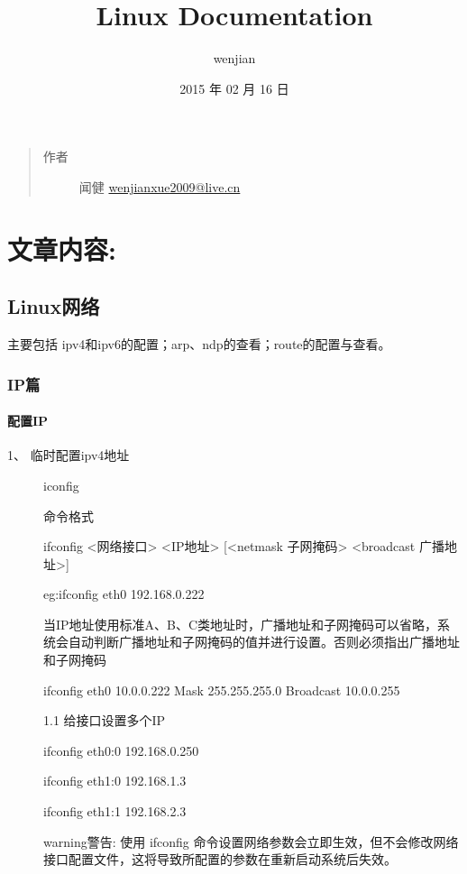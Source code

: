 \documentclass[letterpaper,10pt]{sphinxmanual}
\title{Linux Documentation}
\date{2015 年 02 月 16 日}
\author{wenjian}
\begin{document}
\maketitle
\tableofcontents
{}\label{index::doc}

\begin{quote}\begin{description}
\item[{作者}] \leavevmode
闻健 \href{mailto:wenjianxue2009@live.cn}{wenjianxue2009@live.cn}

\end{description}\end{quote}


\chapter{文章内容:}
\label{index:index}\label{index:id1}\label{index:linux}

\section{Linux网络}
\label{Linux_net/index::doc}\label{Linux_net/index:linux}
主要包括 ipv4和ipv6的配置；arp、ndp的查看；route的配置与查看。


\subsection{IP篇}
\label{Linux_net/ip:ip}\label{Linux_net/ip::doc}

\subsubsection{配置IP}
\label{Linux_net/ip:id1}\begin{description}
\item[{1、 临时配置ipv4地址}] \leavevmode
iconfig

命令格式

ifconfig \textless{}网络接口\textgreater{} \textless{}IP地址\textgreater{} {[}\textless{}netmask 子网掩码\textgreater{} \textless{}broadcast 广播地址\textgreater{}{]}

eg:ifconfig eth0 192.168.0.222

当IP地址使用标准A、B、C类地址时，广播地址和子网掩码可以省略，系统会自动判断广播地址和子网掩码的值并进行设置。否则必须指出广播地址和子网掩码

ifconfig eth0 10.0.0.222 Mask 255.255.255.0 Broadcast 10.0.0.255

1.1 给接口设置多个IP

ifconfig eth0:0 192.168.0.250

ifconfig eth1:0 192.168.1.3

ifconfig eth1:1 192.168.2.3

\begin{notice}{warning}{警告:}
使用 ifconfig 命令设置网络参数会立即生效，但不会修改网络接口配置文件，这将导致所配置的参数在重新启动系统后失效。
\end{notice}

\end{description}
\end{document}
